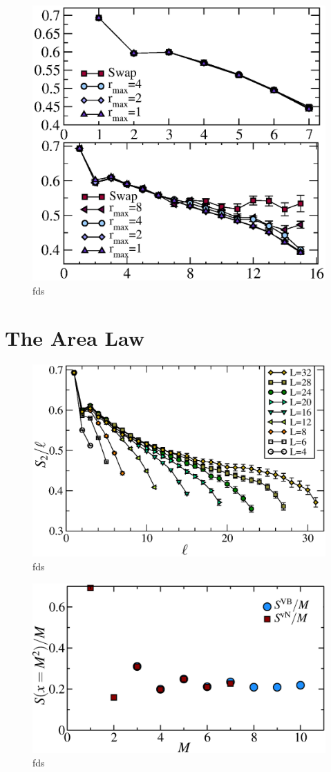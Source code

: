 \begin{figure} {
\includegraphics[width=6in]{./figures/paper2/fig_2DA/fig_L8n16.eps} 
\centering
\caption[fds]{ fds
\label{2Dfig}
}
} 
\end{figure}

\section{The Area Law}

\begin{figure} {
\includegraphics[width=6in]{./figures/paper2/fig_AreaL/fig4.eps} 
\centering
\caption[fds]{ fds
\label{2Dfig}
}
} 
\end{figure}

\begin{figure} {
\includegraphics[width=6in]{./figures/made/marea.eps} 
\caption[fds]{ fds
\label{2Dbetter}
}
} 
\end{figure}
